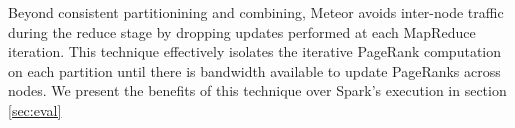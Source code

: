 Beyond consistent partitionining and combining, Meteor avoids inter-node traffic during the reduce stage by dropping updates performed at each MapReduce iteration. This technique effectively isolates the iterative PageRank computation on each partition until there is bandwidth available to update PageRanks across nodes. We present the benefits of this technique over Spark's execution in section \ref{sec:eval}

%

